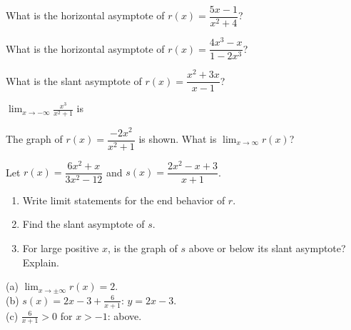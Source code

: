 \begin{exo}{}
What is the horizontal asymptote of $r(x)=\dfrac{5x-1}{x^2+4}$?
\end{exo}
\begin{exo}{}
What is the horizontal asymptote of $r(x)=\dfrac{4x^3-x}{1-2x^3}$?
\end{exo}
\begin{exo}{}
What is the slant asymptote of $r(x)=\dfrac{x^2+3x}{x-1}$?
\end{exo}
\begin{exo}{}
$\displaystyle\lim_{x\to-\infty}\frac{x^3}{x^2+1}$ is
\end{exo}
\begin{exo}{}
The graph of $r(x)=\dfrac{-2x^2}{x^2+1}$ is shown. What is $\displaystyle\lim_{x\to\infty}r(x)$?
\end{exo}
\begin{exo}{}
Let $r(x)=\dfrac{6x^2+x}{3x^2-12}$ and $s(x)=\dfrac{2x^2-x+3}{x+1}$.
\begin{enumerate}[label=(\alph*)]
\item Write limit statements for the end behavior of $r$.
\item Find the slant asymptote of $s$.
\item For large positive $x$, is the graph of $s$ above or below its slant asymptote? Explain.
\end{enumerate}
\begin{solution}
(a) $\lim_{x\to\pm\infty}r(x)=2$.\\
(b) $s(x)=2x-3+\frac{6}{x+1}$: $y=2x-3$.\\
(c) $\frac{6}{x+1}>0$ for $x>-1$: above.
\end{solution}
\end{exo}

